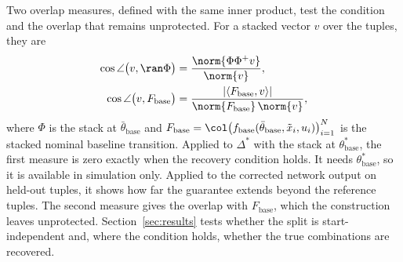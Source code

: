 Two overlap measures, defined with the same inner product, test the
condition and the overlap that remains unprotected.
For a stacked vector $v$ over the tuples, they are
\begin{equation}
\begin{aligned}
 \cos\angle\bigl(v,\ran\Phi\bigr)
 &=\frac{\norm{\Phi\Phi^{+}v}}{\norm{v}},\\
 \cos\angle\bigl(v,F_{\mathrm{base}}\bigr)
 &=\frac{|\langle F_{\mathrm{base}},v\rangle|}
   {\norm{F_{\mathrm{base}}}\,\norm{v}},
\end{aligned}
\label{eq:obc_overlap}
\end{equation}
where $\Phi$ is the stack at $\bar\theta_{\mathrm{base}}$ and
$F_{\mathrm{base}}=\col\bigl(f_{\mathrm{base}}(\bar\theta_{\mathrm{base}},
\tilde x_i,u_i)\bigr)_{i=1}^{N}$ is the stacked nominal baseline transition.
Applied to $\Delta^*$ with the stack at $\theta^*_{\mathrm{base}}$, the first
measure is zero exactly when the recovery condition holds.
It needs $\theta^*_{\mathrm{base}}$, so it is available in simulation only.
Applied to the corrected network output on held-out tuples, it shows how far
the guarantee extends beyond the reference tuples.
The second measure gives the overlap with $F_{\mathrm{base}}$, which the
construction leaves unprotected.
Section~\ref{sec:results} tests whether the split is start-independent and,
where the condition holds, whether the true combinations are recovered.
